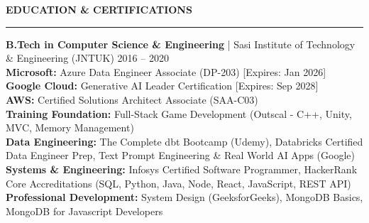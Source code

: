 \documentclass[10pt, letterpaper]{article}
\newcommand{\resumesection}[1]{
  \vspace{8pt}
  \noindent \textbf{\large \uppercase{#1}} \\
  \vspace{-8pt}
  \hrule
  \vspace{6pt}
}
\begin{document}
\resumesection{Education \& Certifications}
\noindent \textbf{B.Tech in Computer Science \& Engineering} | Sasi Institute of Technology \& Engineering (JNTUK) \hfill 2016 -- 2020 \\
\textbf{Microsoft:} Azure Data Engineer Associate (DP-203) [Expires: Jan 2026] \\
\textbf{Google Cloud:} Generative AI Leader Certification [Expires: Sep 2028] \\
\textbf{AWS:} Certified Solutions Architect Associate (SAA-C03) \\
\textbf{Training Foundation:} Full-Stack Game Development (Outscal - C++, Unity, MVC, Memory Management) \\
\textbf{Data Engineering:} The Complete dbt Bootcamp (Udemy), Databricks Certified Data Engineer Prep, Text Prompt Engineering \& Real World AI Apps (Google) \\
\textbf{Systems \& Engineering:} Infosys Certified Software Programmer, HackerRank Core Accreditations (SQL, Python, Java, Node, React, JavaScript, REST API) \\
\textbf{Professional Development:} System Design (GeeksforGeeks), MongoDB Basics, MongoDB for Javascript Developers
\end{document}

